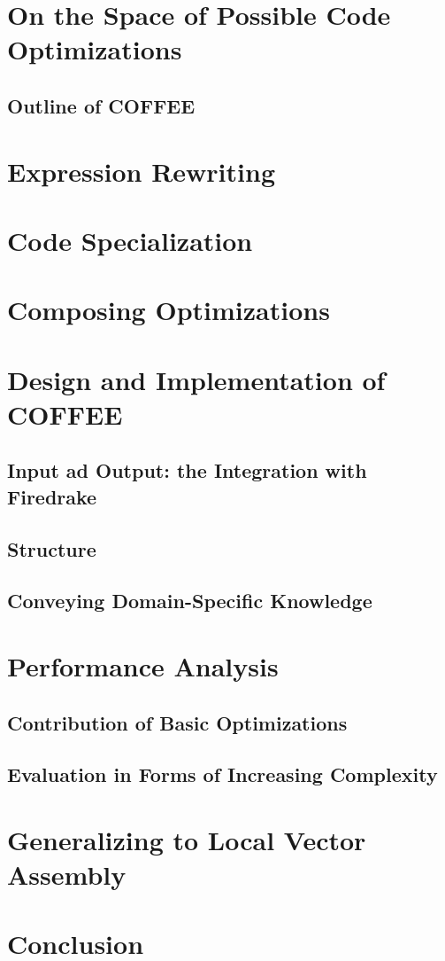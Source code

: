 \section{On the Space of Possible Code Optimizations}
\subsection{Outline of COFFEE}

\section{Expression Rewriting}

\section{Code Specialization}

\section{Composing Optimizations}

\section{Design and Implementation of COFFEE}
\subsection{Input ad Output: the Integration with Firedrake}
\subsection{Structure}
\subsection{Conveying Domain-Specific Knowledge}

\section{Performance Analysis}
\subsection{Contribution of Basic Optimizations}
\subsection{Evaluation in Forms of Increasing Complexity}

\section{Generalizing to Local Vector Assembly}

\section{Conclusion}